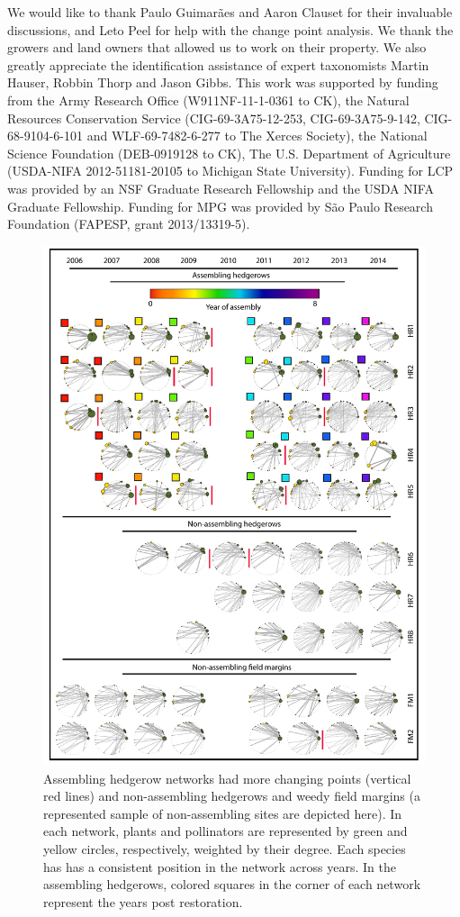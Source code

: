 \documentclass[12pt]{article}
\begin{document}
We would like to thank Paulo Guimar{\~a}es and Aaron Clauset for their
invaluable discussions, and Leto Peel for help with the change point
analysis.  We thank the growers and land owners that allowed us to
work on their property.  We also greatly appreciate the identification
assistance of expert taxonomists Martin Hauser, Robbin Thorp and Jason
Gibbs.  This work was supported by funding from the Army Research
Office (W911NF-11-1-0361 to CK), the Natural Resources Conservation
Service (CIG-69-3A75-12-253, CIG-69-3A75-9-142, CIG-68-9104-6-101 and
WLF-69-7482-6-277 to The Xerces Society), the National Science
Foundation (DEB-0919128 to CK), The U.S.  Department of Agriculture
(USDA-NIFA 2012-51181-20105 to Michigan State University).  Funding
for LCP was provided by an NSF Graduate Research Fellowship and the
USDA NIFA Graduate Fellowship. Funding for MPG was provided by S{\~a}o
Paulo Research Foundation (FAPESP, grant 2013/13319-5).





\begin{figure}
  \centering
  \includegraphics[width=.8\textwidth]{../analysis/changePoint/plotting/networks.pdf}
  \caption{Assembling hedgerow networks had more changing points
    (vertical red lines) and non-assembling hedgerows and weedy field
    margins (a represented sample of non-assembling sites are depicted
    here). In each network, plants and pollinators are represented by
    green and yellow circles, respectively, weighted by their
    degree. Each species has has a consistent position in the network
    across years. In the assembling hedgerows, colored squares in the
    corner of each network represent the years post restoration.}
  \label{fig:changePoints}
\end{figure}
\clearpage
\end{document}
